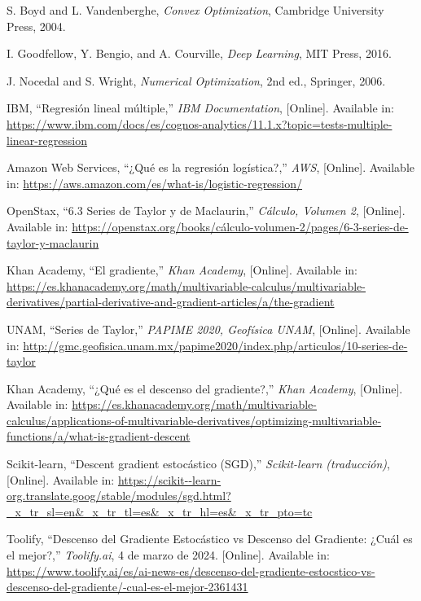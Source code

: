 \documentclass[12pt, letterpaper,conference]{IEEEtran}
\begin{document}
\vspace{0.25cm}

\begin{thebibliography}{99}

S. Boyd and L. Vandenberghe, \textit{Convex Optimization}, Cambridge University Press, 2004.

I. Goodfellow, Y. Bengio, and A. Courville, \textit{Deep Learning}, MIT Press, 2016.

J. Nocedal and S. Wright, \textit{Numerical Optimization}, 2nd ed., Springer, 2006.


IBM, ``Regresión lineal múltiple,'' \textit{IBM Documentation}, [Online]. Available in: \url{https://www.ibm.com/docs/es/cognos-analytics/11.1.x?topic=tests-multiple-linear-regression}

Amazon Web Services, ``¿Qué es la regresión logística?,'' \textit{AWS}, [Online]. Available in: \url{https://aws.amazon.com/es/what-is/logistic-regression/}

OpenStax, ``6.3 Series de Taylor y de Maclaurin,'' \textit{Cálculo, Volumen 2}, [Online]. Available in: \url{https://openstax.org/books/cálculo-volumen-2/pages/6-3-series-de-taylor-y-maclaurin}

Khan Academy, ``El gradiente,'' \textit{Khan Academy}, [Online]. Available in: \url{https://es.khanacademy.org/math/multivariable-calculus/multivariable-derivatives/partial-derivative-and-gradient-articles/a/the-gradient}

UNAM, ``Series de Taylor,'' \textit{PAPIME 2020, Geofísica UNAM}, [Online]. Available in: \url{http://gmc.geofisica.unam.mx/papime2020/index.php/articulos/10-series-de-taylor}

Khan Academy, ``¿Qué es el descenso del gradiente?,'' \textit{Khan Academy}, [Online]. Available in: \url{https://es.khanacademy.org/math/multivariable-calculus/applications-of-multivariable-derivatives/optimizing-multivariable-functions/a/what-is-gradient-descent}

Scikit-learn, ``Descent gradient estocástico (SGD),'' \textit{Scikit-learn (traducción)}, [Online]. Available in: \url{https://scikit--learn-org.translate.goog/stable/modules/sgd.html?_x_tr_sl=en&_x_tr_tl=es&_x_tr_hl=es&_x_tr_pto=tc}

Toolify, ``Descenso del Gradiente Estocástico vs Descenso del Gradiente: ¿Cuál es el mejor?,'' \textit{Toolify.ai}, 4 de marzo de 2024. [Online]. Available in: \url{https://www.toolify.ai/es/ai-news-es/descenso-del-gradiente-estocstico-vs-descenso-del-gradiente/-cual-es-el-mejor-2361431}


\end{thebibliography}
\end{document}
